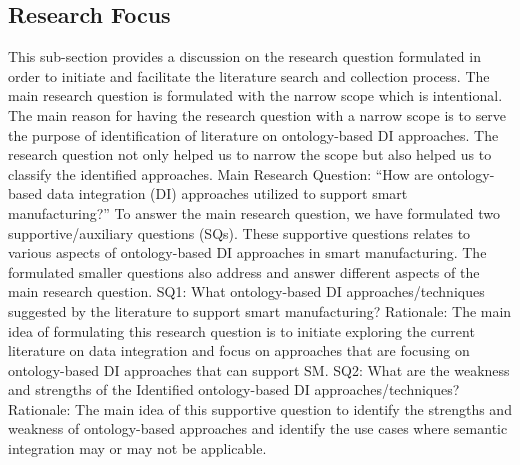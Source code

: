 \subsection{Research Focus}
This sub-section provides a discussion on the research question formulated in order to initiate and facilitate the literature search and collection process. The main research question is formulated with the narrow scope which is intentional. The main reason for having the research question with a narrow scope is to serve the purpose of identification of literature on ontology-based DI approaches. The research question not only helped us to narrow the scope but also helped us to classify the identified approaches.
Main Research Question: “How are ontology-based data integration (DI) approaches utilized to support smart manufacturing?”
To answer the main research question, we have formulated two supportive/auxiliary questions (SQs). These supportive questions relates to various aspects of ontology-based DI approaches in smart manufacturing. The formulated smaller questions also address and answer different aspects of the main research question.
SQ1: What ontology-based DI approaches/techniques suggested by the literature to support smart manufacturing?
Rationale: The main idea of formulating this research question is to initiate exploring the current literature on data integration and focus on approaches that are focusing on ontology-based DI approaches that can support SM.
SQ2: What are the weakness and strengths of the Identified ontology-based DI approaches/techniques?
Rationale: The main idea of this supportive question to identify the strengths and weakness of ontology-based approaches and identify the use cases where semantic integration may or may not be applicable.
